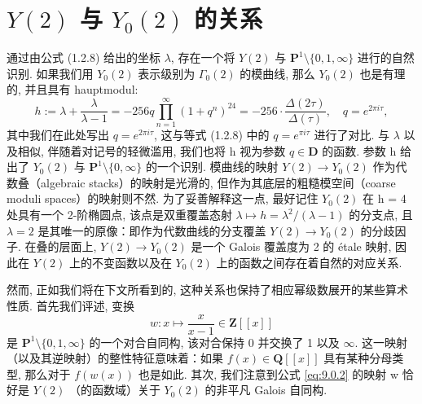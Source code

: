 \section{\texorpdfstring{$Y(2)$}{Y(2)} 与 \texorpdfstring{$Y_0(2)$}{Y\_0(2)} 的关系}\label{sec:9}

通过由公式 (1.2.8) 给出的坐标 \(\lambda\), 存在一个将 \(Y(2)\) 与 \(\mathbf{P}^1 \setminus \{0, 1, \infty\}\) 进行的自然识别. 
如果我们用 \(Y_0(2)\) 表示级别为 \(\Gamma_0(2)\) 的模曲线, 
那么 \(Y_0(2)\) 也是有理的, 并且具有 hauptmodul:
\begin{equation}\label{eq:9.0.1}
h := \lambda + \frac{\lambda}{\lambda - 1} = -256q \prod_{n=1}^{\infty} (1 + q^n)^{24} = -256 \cdot \frac{\Delta(2\tau)}{\Delta(\tau)}, \quad q = e^{2\pi i \tau},
\end{equation}
其中我们在此处写出 \(q = e^{2\pi i \tau}\), 
这与等式 (1.2.8) 中的 \(q = e^{\pi i \tau}\) 进行了对比. 
与 \(\lambda\) 以及相似, 伴随着对记号的轻微滥用, 
我们也将 h 视为参数 \(q \in \mathbf{D}\) 的函数. 
参数 h 给出了 \(Y_0(2)\) 与 \(\mathbf{P}^1 \setminus \{0, \infty\}\) 的一个识别. 
模曲线的映射 \(Y(2) \to Y_0(2)\) 作为代数叠（algebraic stacks）的映射是光滑的, 
但作为其底层的粗糙模空间（coarse moduli spaces）的映射则不然. 
为了妥善解释这一点, 最好记住 \(Y_0(2)\) 在 h = 4 处具有一个 2-阶椭圆点, 
该点是双重覆盖态射 \(\lambda \mapsto h = \lambda^2/(\lambda - 1)\) 的分支点, 
且 \(\lambda = 2\) 是其唯一的原像：即作为代数曲线的分支覆盖 \(Y(2) \to Y_0(2)\) 的分歧因子. 
在叠的层面上, \(Y(2) \to Y_0(2)\) 是一个 Galois 覆盖度为 2 的 {\'e}tale 映射, 
因此在 \(Y(2)\) 上的不变函数以及在 \(Y_0(2)\) 上的函数之间存在着自然的对应关系.

然而, 正如我们将在下文所看到的, 这种关系也保持了相应幂级数展开的某些算术性质. 
首先我们评述, 变换
\begin{equation}\label{eq:9.0.2}
w: x \mapsto \frac{x}{x-1} \in \mathbf{Z}[\![x]\!]
\end{equation}
是 \(\mathbf{P}^1 \setminus \{0, 1, \infty\}\) 的一个对合自同构, 
该对合保持 0 并交换了 1 以及 \(\infty\). 
这一映射（以及其逆映射）的整性特征意味着：如果 \(f(x) \in \mathbf{Q}[\![x]\!]\) 具有某种分母类型, 
那么对于 \(f(w(x))\) 也是如此. 
其次, 我们注意到公式 \eqref{eq:9.0.2} 的映射 w 恰好是 \(Y(2)\) （的函数域）关于 \(Y_0(2)\) 的非平凡 Galois 自同构.

